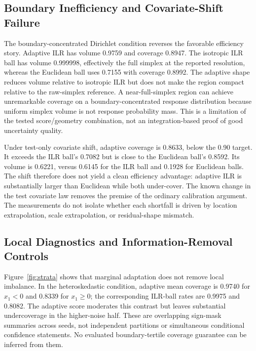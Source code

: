 \documentclass{article}
\begin{document}
\subsection{Boundary Inefficiency and Covariate-Shift Failure}
The boundary-concentrated Dirichlet condition reverses the favorable efficiency story. Adaptive ILR has volume 0.9759 and coverage 0.8947. The isotropic ILR ball has volume 0.999998, effectively the full simplex at the reported resolution, whereas the Euclidean ball uses 0.7155 with coverage 0.8992. The adaptive shape reduces volume relative to isotropic ILR but does not make the region compact relative to the raw-simplex reference. A near-full-simplex region can achieve unremarkable coverage on a boundary-concentrated response distribution because uniform simplex volume is not response probability mass. This is a limitation of the tested score/geometry combination, not an integration-based proof of good uncertainty quality.

Under test-only covariate shift, adaptive coverage is 0.8633, below the 0.90 target. It exceeds the ILR ball's 0.7082 but is close to the Euclidean ball's 0.8592. Its volume is 0.6221, versus 0.6145 for the ILR ball and 0.1928 for Euclidean balls. The shift therefore does not yield a clean efficiency advantage: adaptive ILR is substantially larger than Euclidean while both under-cover. The known change in the test covariate law removes the premise of the ordinary calibration argument. The measurements do not isolate whether each shortfall is driven by location extrapolation, scale extrapolation, or residual-shape mismatch.

\subsection{Local Diagnostics and Information-Removal Controls}
Figure~\ref{fig:strata} shows that marginal adaptation does not remove local imbalance. In the heteroskedastic condition, adaptive mean coverage is 0.9740 for $x_1<0$ and 0.8339 for $x_1\ge0$; the corresponding ILR-ball rates are 0.9975 and 0.8082. The adaptive score moderates this contrast but leaves substantial undercoverage in the higher-noise half. These are overlapping sign-mask summaries across seeds, not independent partitions or simultaneous conditional confidence statements. No evaluated boundary-tertile coverage guarantee can be inferred from them.
\end{document}
